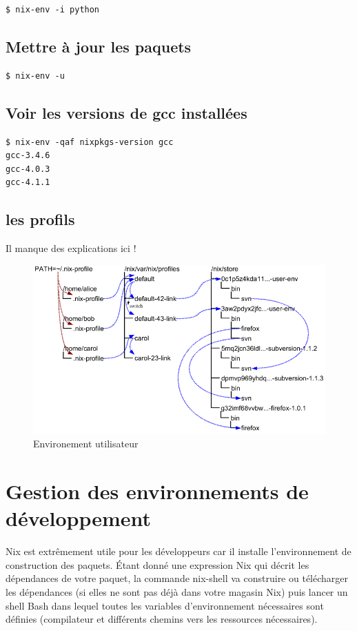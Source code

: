 \documentclass[final]{beamer}
\begin{document}
\begin{frame}[fragile]
\begin{multicols}{3}
\begin{verbatim}
$ nix-env -i python
\end{verbatim}

\subsection{Mettre à jour les paquets}
\begin{verbatim}
$ nix-env -u
\end{verbatim}

\subsection{Voir les versions de gcc installées}
\begin{verbatim}
$ nix-env -qaf nixpkgs-version gcc
gcc-3.4.6
gcc-4.0.3
gcc-4.1.1
\end{verbatim}

\subsection{les profils}
Il manque des explications ici !

\begin{figure}
\centering
\includegraphics[width=0.99\columnwidth]{user-environments.png}
\caption{Environement utilisateur}
\end{figure}

\section{Gestion des environnements de développement}
Nix est extrêmement utile pour les développeurs car il installe l'environnement de construction des paquets. Étant donné une expression Nix qui décrit les dépendances de votre paquet, la commande nix-shell va construire ou télécharger les dépendances (si elles ne sont pas déjà dans votre magasin Nix) puis lancer un shell Bash dans lequel toutes les variables d'environnement nécessaires sont définies (compilateur et  différents chemins vers les ressources nécessaires).


\end{multicols}
\end{frame}
\end{document}
